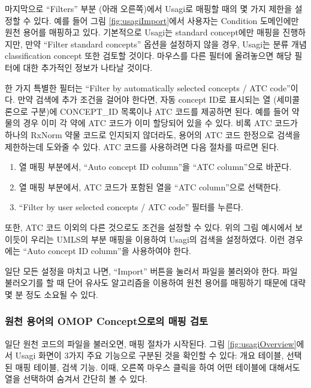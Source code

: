 \documentclass[10.5pt]{book}
\providecommand{\tightlist}{%
  \setlength{\itemsep}{0pt}\setlength{\parskip}{0pt}}
\theoremstyle{definition}
\theoremstyle{definition}
\theoremstyle{definition}
\theoremstyle{remark}
\begin{document}
마지막으로 ``Filters'' 부분 (아래 오른쪽)에서 Usagi로 매핑할 때의 몇
가지 제한을 설정할 수 있다. 예를 들어 그림 \ref{fig:usagiImport}에서
사용자는 Condition 도메인에만 원천 용어를 매핑하고 있다. 기본적으로
Usagi는 standard concept에만 매핑을 진행하지만, 만약 ``Filter standard
concepts'' 옵션을 설정하지 않을 경우, Usagi는 분류 개념 classification
concept 또한 검토할 것이다. 마우스를 다른 필터에 올려놓으면 해당 필터에
대한 추가적인 정보가 나타날 것이다.

한 가지 특별한 필터는 ``Filter by automatically selected concepts / ATC
code''이다. 만약 검색에 추가 조건을 걸어야 한다면, 자동 concept ID로
표시되는 열 (세미콜론으로 구분)에 CONCEPT\_ID 목록이나 ATC 코드를
제공하면 된다. 예를 들어 약물의 경우 이미 각 약에 ATC 코드가 이미
할당되어 있을 수 있다. 비록 ATC 코드가 하나의 RxNorm 약물 코드로
인지되지 않더라도, 용어의 ATC 코드 한정으로 검색을 제한하는데 도와줄 수
있다. ATC 코드를 사용하려면 다음 절차를 따르면 된다.

\begin{enumerate}
\def\labelenumi{\arabic{enumi}.}
\tightlist
\item
  열 매핑 부분에서, ``Auto concept ID column''을 ``ATC column''으로
  바꾼다.
\item
  열 매핑 부분에서, ATC 코드가 포함된 열을 ``ATC column''으로 선택한다.
\item
  ``Filter by user selected concepts / ATC code'' 필터를 누른다.
\end{enumerate}

또한, ATC 코드 이외의 다른 것으로도 조건을 설정할 수 있다. 위의 그림
예시에서 보이듯이 우리는 UMLS의 부분 매핑을 이용하여 Usagi의 검색을
설정하였다. 이런 경우에는 ``Auto concept ID column''을 사용하여야 한다.

일단 모든 설정을 마치고 나면, ``Import'' 버튼을 눌러서 파일을 불러와야
한다. 파일 불러오기를 할 때 단어 유사도 알고리즘을 이용하여 원천 용어를
매핑하기 때문에 대략 몇 분 정도 소요될 수 있다.

\subsubsection*{원천 용어의 OMOP Concept으로의 매핑
검토}\label{--omop-concept--}

일단 원천 코드의 파일을 불러오면, 매핑 절차가 시작된다. 그림
\ref{fig:usagiOverview}에서 Usagi 화면이 3가지 주요 기능으로 구분된 것을
확인할 수 있다: 개요 테이블, 선택된 매핑 테이블, 검색 기능. 이때, 오른쪽
마우스 클릭을 하여 어떤 테이블에 대해서도 열을 선택하여 숨겨서 간단히 볼
수 있다.
\end{document}
